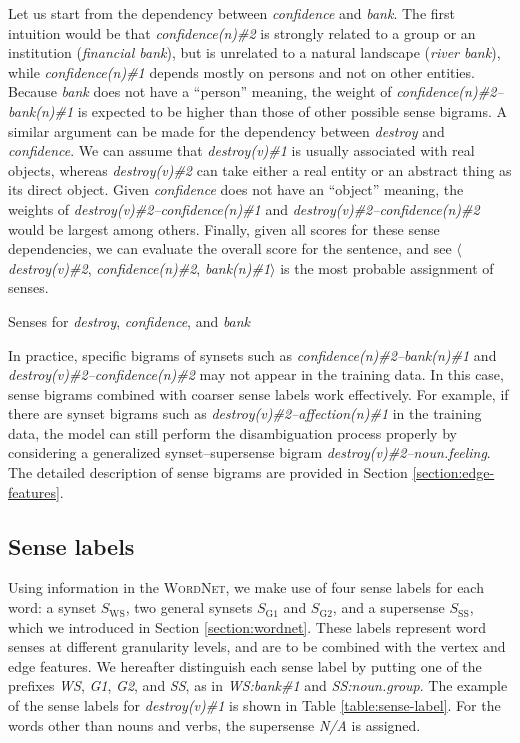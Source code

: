 \documentclass[english]{jnlp_1.4}
\begin{document}
Let us start from the dependency between \textit{confidence} and \textit{bank}.
The first intuition would be that \textit{confidence(n)\#2} is strongly related to a group or an institution (\textit{financial bank}), but is unrelated to a natural landscape (\textit{river bank}), while \textit{confidence(n)\#1} depends mostly on persons and not on other entities.
Because \textit{bank} does not have a ``person'' meaning, the weight of \textit{confidence(n)\#2--bank(n)\#1} is expected to be higher than those of other possible sense bigrams.
A similar argument can be made for the dependency between \textit{destroy} and \textit{confidence}.
We can assume that \textit{destroy(v)\#1} is usually associated with real objects, whereas \textit{destroy(v)\#2} can take either a real entity or an abstract thing as its direct object.
Given \textit{confidence} does not have an ``object'' meaning, the weights of \textit{destroy(v)\#2--confidence(n)\#1} and \textit{destroy(v)\#2--confidence(n)\#2} would be largest among others.
Finally, given all scores for these sense dependencies, we can evaluate the overall score for the sentence, and see $\langle$\textit{destroy(v)\#2}, \textit{confidence(n)\#2}, \textit{bank(n)\#1}$\rangle$ is the most probable assignment of senses.


\begin{table}[t]
\caption{Senses for \textit{destroy}, \textit{confidence}, and \textit{bank}}
\label{table:senses}

\end{table}

In practice, specific bigrams of synsets such as \textit{confidence(n)\#2--bank(n)\#1} and \textit{destroy(v)\#2--confidence(n)\#2} may not appear in the training data.
In this case, sense bigrams combined with coarser sense labels work effectively.
For example, if there are synset bigrams such as \textit{destroy(v)\#2--affection(n)\#1} in the training data, the model can still perform the disambiguation process properly by considering a generalized synset--supersense bigram \textit{destroy(v)\#2--noun.feeling}.
The detailed description of sense bigrams are provided in Section \ref{section:edge-features}.


\subsection{Sense labels}
\label{section:sense-labels}

Using information in the \textsc{WordNet}, we make use of four sense labels for each word: a synset $S_{\mathrm{WS}}$, two general synsets $S_{\mathrm{G1}}$ and $S_{\mathrm{G2}}$, and a supersense $S_{\mathrm{SS}}$, which we introduced in Section \ref{section:wordnet}.
These labels represent word senses at different granularity levels, and are to be combined with the vertex and edge features.
We hereafter distinguish each sense label by putting one of the prefixes \textit{WS}, \textit{G1}, \textit{G2}, and \textit{SS}, as in \textit{WS:bank\#1} and \textit{SS:noun.group}.
The example of the sense labels for \textit{destroy(v)\#1} is shown in Table \ref{table:sense-label}.
For the words other than nouns and verbs, the supersense \textit{N/A} is assigned.
\end{document}
